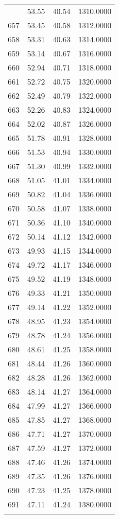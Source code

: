 \documentclass[
  captions=tableheading,
]{scrartcl}
\begin{document}
\begin{longtable} {l|l|l|l}
{656	& 53.55	& 40.54	& 1310.0000\\
657	& 53.45	& 40.58	& 1312.0000\\
658	& 53.31	& 40.63	& 1314.0000\\
659	& 53.14	& 40.67	& 1316.0000\\
660	& 52.94	& 40.71	& 1318.0000\\
661	& 52.72	& 40.75	& 1320.0000\\
662	& 52.49	& 40.79	& 1322.0000\\
663	& 52.26	& 40.83	& 1324.0000\\
664	& 52.02	& 40.87	& 1326.0000\\
665	& 51.78	& 40.91	& 1328.0000\\
666	& 51.53	& 40.94	& 1330.0000\\
667	& 51.30	& 40.99	& 1332.0000\\
668	& 51.05	& 41.01	& 1334.0000\\
669	& 50.82	& 41.04	& 1336.0000\\
670	& 50.58	& 41.07	& 1338.0000\\
671	& 50.36	& 41.10	& 1340.0000\\
672	& 50.14	& 41.12	& 1342.0000\\
673	& 49.93	& 41.15	& 1344.0000\\
674	& 49.72	& 41.17	& 1346.0000\\
675	& 49.52	& 41.19	& 1348.0000\\
676	& 49.33	& 41.21	& 1350.0000\\
677	& 49.14	& 41.22	& 1352.0000\\
678	& 48.95	& 41.23	& 1354.0000\\
679	& 48.78	& 41.24	& 1356.0000\\
680	& 48.61	& 41.25	& 1358.0000\\
681	& 48.44	& 41.26	& 1360.0000\\
682	& 48.28	& 41.26	& 1362.0000\\
683	& 48.14	& 41.27	& 1364.0000\\
684	& 47.99	& 41.27	& 1366.0000\\
685	& 47.85	& 41.27	& 1368.0000\\
686	& 47.71	& 41.27	& 1370.0000\\
687	& 47.59	& 41.27	& 1372.0000\\
688	& 47.46	& 41.26	& 1374.0000\\
689	& 47.35	& 41.26	& 1376.0000\\
690	& 47.23	& 41.25	& 1378.0000\\
691	& 47.11	& 41.24	& 1380.0000\\
}
\end{longtable}
\end{document}

